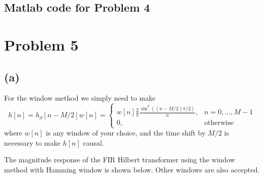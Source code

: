 \documentclass{article}
\begin{document}
\subsection{Matlab code for Problem 4}


\newpage
\section{Problem 5}
\subsection{(a)}

For the window method we simply need to make
\begin{equation}
	h[n] = h_d[n-M/2]w[n] = \begin{cases}
	w[n]\frac{2}{\pi}\frac{\sin^2((n-M/2)\pi/2)}{n}, & n = 0, \ldots, M-1 \\
	0, & \text{otherwise}
	\end{cases} 
\end{equation}
where $w[n]$ is any window of your choice, and the time shift by $M/2$ is necessary to make $h[n]$ causal.

The magnitude response of the FIR Hilbert transformer using the window method with Hamming window is shown below. Other windows are also accepted.
\end{document}
